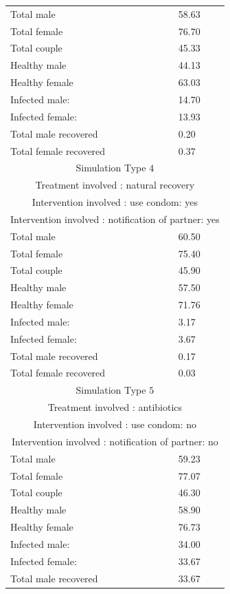 \documentclass{article}
\begin{document}
\begin{normalsize}
\begin{longtable}{|p{7cm}|p{7cm}|}
		\hline
		Total male & 58.63\\
		Total female & 76.70\\
		Total couple & 45.33\\
		Healthy male & 44.13\\
		Healthy female & 63.03\\
		Infected male: & 14.70\\
		Infected female: & 13.93\\
		Total male recovered & 0.20\\
		Total female recovered & 0.37\\		
		\hline
		\multicolumn{2}{|c|}{Simulation Type $4$} \\
		\multicolumn{2}{|c|}{Treatment involved : natural recovery} \\
		\multicolumn{2}{|c|}{Intervention involved : use condom: yes} \\
		\multicolumn{2}{|c|}{Intervention involved : notification of partner: yes} \\
		\hline
		Total male & 60.50\\
		Total female & 75.40\\
		Total couple & 45.90\\
		Healthy male & 57.50\\
		Healthy female & 71.76\\
		Infected male: & 3.17\\
		Infected female: & 3.67\\
		Total male recovered & 0.17\\
		Total female recovered & 0.03\\		
		\hline
		\multicolumn{2}{|c|}{Simulation Type $5$} \\
		\multicolumn{2}{|c|}{Treatment involved : antibiotics} \\
		\multicolumn{2}{|c|}{Intervention involved : use condom: no} \\
		\multicolumn{2}{|c|}{Intervention involved : notification of partner: no} \\
		\hline
		Total male & 59.23\\
		Total female & 77.07\\
		Total couple & 46.30\\
		Healthy male & 58.90\\
		Healthy female & 76.73\\
		Infected  male: & 34.00\\
		Infected female: & 33.67\\
		Total male recovered & 33.67\\

\end{longtable}
\end{normalsize}
\end{document}
